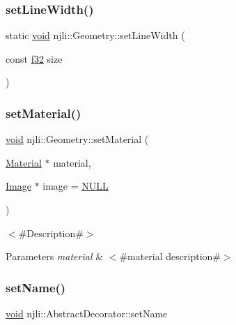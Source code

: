 \subsubsection{\texorpdfstring{set\+Line\+Width()}{setLineWidth()}}
{\footnotesize\ttfamily static \mbox{\hyperlink{_thread_8h_af1e856da2e658414cb2456cb6f7ebc66}{void}} njli\+::\+Geometry\+::set\+Line\+Width (\begin{DoxyParamCaption}\item[{const \mbox{\hyperlink{_util_8h_a5f6906312a689f27d70e9d086649d3fd}{f32}}}]{size }\end{DoxyParamCaption})\hspace{0.3cm}{\ttfamily [static]}}

\mbox{\label{classnjli_1_1_geometry_a8cd2fdd337567a3ec1b6ad53e8010afa}} 
\subsubsection{\texorpdfstring{set\+Material()}{setMaterial()}}
{\footnotesize\ttfamily \mbox{\hyperlink{_thread_8h_af1e856da2e658414cb2456cb6f7ebc66}{void}} njli\+::\+Geometry\+::set\+Material (\begin{DoxyParamCaption}\item[{\mbox{\hyperlink{classnjli_1_1_material}{Material}} $\ast$}]{material,  }\item[{\mbox{\hyperlink{classnjli_1_1_image}{Image}} $\ast$}]{image = {\ttfamily \mbox{\hyperlink{_util_8h_a070d2ce7b6bb7e5c05602aa8c308d0c4}{N\+U\+LL}}} }\end{DoxyParamCaption})}

$<$\#\+Description\#$>$


\begin{DoxyParams}{Parameters}
{\em material} & $<$\#material description\#$>$ \\
\hline
\end{DoxyParams}
\mbox{\label{classnjli_1_1_geometry_a087eb5f8d9f51cc476f12f1d10a3cb95}} 
\subsubsection{\texorpdfstring{set\+Name()}{setName()}}
{\footnotesize\ttfamily \mbox{\hyperlink{_thread_8h_af1e856da2e658414cb2456cb6f7ebc66}{void}} njli\+::\+Abstract\+Decorator\+::set\+Name}

